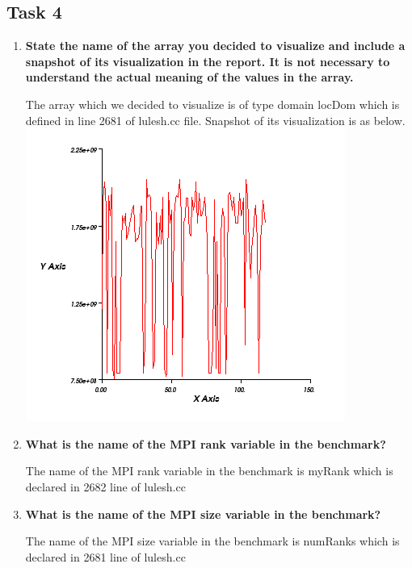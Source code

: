 \documentclass[10pt, letterpaper, twoside]{article}
\begin{document}
\begin{titlepage}
\subsection{Task 4}

\begin{enumerate}
\item \textbf{State the name of the array you decided to visualize and include a snapshot of its visualization in the report. It is not necessary to understand the actual meaning of the values in the array.} 

The array which we decided to visualize is of type domain locDom which is defined in line 2681 of lulesh.cc file. Snapshot of its visualization is as below. \\

\hspace{25mm}
\includegraphics[scale = 0.75]{locdom.png}
\vspace{5mm}


\item \textbf{What is the name of the MPI rank variable in the benchmark?}

The name of the MPI rank variable in the benchmark is myRank which is declared in 2682 line of lulesh.cc \\

\item \textbf{What is the name of the MPI size variable in the benchmark?}

The name of the MPI size variable in the benchmark is numRanks which is declared in 2681 line of lulesh.cc \\


\end{enumerate}
\end{titlepage}
\end{document}
